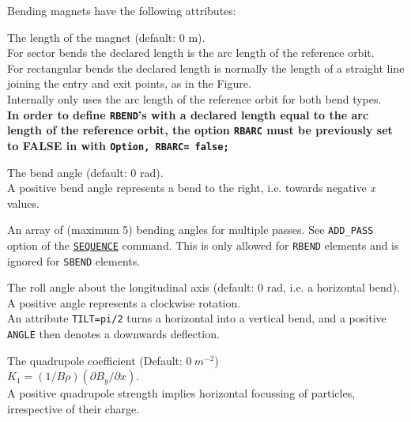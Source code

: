 Bending magnets have the following attributes:
\begin{madlist}
    The length of the magnet (default: 0 m). \\
   For sector bends the declared length is the arc length 
   of the reference orbit. \\
   For rectangular bends the declared length is normally the length of a
   straight line joining the entry and exit points, as in the
   Figure. \\ 
   Internally \madx only uses the arc length of the reference orbit for
   both bend types.\\ 
   \textbf{In order to define \texttt{RBEND}'s with a declared length equal to the
     arc length of the reference orbit, the option \texttt{RBARC} must be
     previously set to FALSE in \madx with \texttt{Option, RBARC= false;}} 
   
    The bend angle (default: 0 rad). \\ 
   A positive bend angle represents a bend to the right, i.e. towards
   negative \textit{x} values.  
   
    An array of (maximum 5) bending angles for
   multiple passes. See \texttt{ADD\_PASS} option of the
   \hyperref[chap:sequence]{\texttt{SEQUENCE}} command. This is only
   allowed for \texttt{RBEND} elements and is ignored for \texttt{SBEND}
   elements.
 
    The roll angle about the longitudinal axis (default: 0
   rad, i.e. a horizontal bend). \\ 
   A positive angle represents a clockwise rotation. \\ 
   An attribute \texttt{TILT=pi/2} turns a horizontal into a vertical
   bend, and a positive \texttt{ANGLE} then denotes a downwards
   deflection. 


    The quadrupole coefficient (Default: $0\ m^{-2}$)\\
     $K_1 = (1/B\rho) (\partial B_y / \partial x)$. \\
     A positive quadrupole strength implies horizontal focussing of particles, 
     irrespective of their charge.


\end{madlist}
